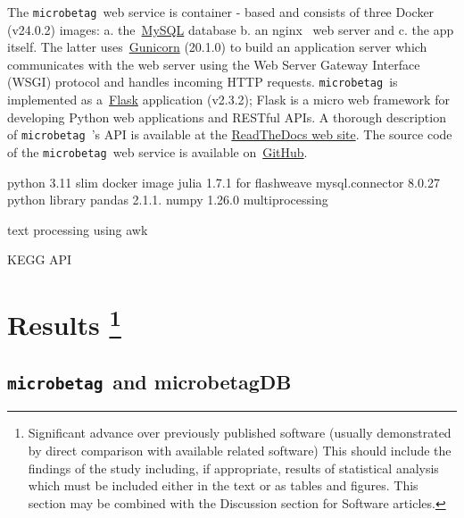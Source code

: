 \documentclass[sn-mathphys,Numbered, lineno]{sn-jnl}  %
\theoremstyle{thmstyleone}%
\theoremstyle{thmstyletwo}%
\theoremstyle{thmstylethree}%
\newcommand{\microbetag}{\texttt{microbetag }}
\begin{document}
        The \microbetag web service is container - based and consists of three Docker~\cite{merkel2014docker} (v24.0.2) images: 
        a. the~\href{https://www.mysql.com}{MySQL} database 
        b. an nginx~\cite{nginx} web server and 
        c. the app itself. 
        The latter uses~\href{https://gunicorn.org}{Gunicorn} (20.1.0) to build an application server which communicates with the web server using the Web Server Gateway Interface (WSGI) protocol and handles incoming HTTP requests.
        \microbetag is implemented as a~\href{https://flask.palletsprojects.com/en/3.0.x/}{Flask} application (v2.3.2); Flask is 
        a micro web framework for developing Python web applications and RESTful APIs. 
        A thorough description of \microbetag's API is available at the \href{https://hariszaf.github.io/microbetag/docs/api/}{ReadTheDocs web site}. 
        The source code of the \microbetag web service is available on~\href{https://github.com/msysbio/microbetagApp/}{GitHub}.

        python 3.11 slim docker image 
        julia 1.7.1 for flashweave 
        mysql.connector 8.0.27 python library
        pandas 2.1.1.
        numpy 1.26.0
        multiprocessing

        text processing using awk 

        KEGG API






\section*{
    Results
    \footnote{
        Significant advance over previously published software (usually demonstrated by direct comparison with available related software)
        This should include the findings of the study including, if appropriate, results of statistical analysis which must be included either in the text or as tables and figures. 
        This section may be combined with the Discussion section for Software articles.
    }
}
\label{sec:results}



    \subsection*{\microbetag and microbetagDB}
    \label{subsec:microbetagdb}
\end{document}
